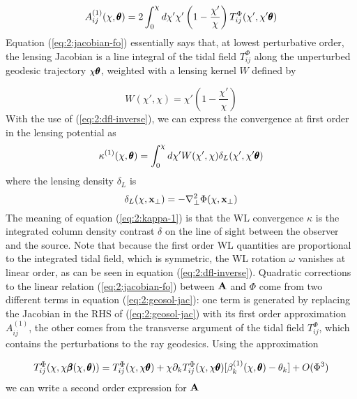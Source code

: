 \begin{equation}
\label{eq:2:jacobian-fo}
A_{ij}^{(1)}(\chi,\pmb{\theta}) = 2\int_0^\chi d\chi'\chi'\left(1-\frac{\chi'}{\chi}\right)T^{\Phi}_{ij}(\chi',\chi'\pmb{\theta})
\end{equation}
%
Equation (\ref{eq:2:jacobian-fo}) essentially says that, at lowest perturbative order, the lensing Jacobian is a line integral of the tidal field $T^{\Phi}_{ij}$ along the unperturbed geodesic trajectory $\chi\pmb{\theta}$, weighted with a lensing kernel $W$ defined by

\begin{equation}
W(\chi',\chi) = \chi'\left(1-\frac{\chi'}{\chi}\right) 
\end{equation}
%
With the use of (\ref{eq:2:dfl-inverse}), we can express the convergence at first order in the lensing potential as
\begin{equation}
\label{eq:2:kappa-1}
\kappa^{(1)}(\chi,\pmb{\theta}) = \int_0^{\chi}d\chi' W(\chi',\chi)\delta_L(\chi',\chi'\pmb{\theta})
\end{equation}
%
where the lensing density $\delta_L$ is 
\begin{equation}
\label{eq:2:deltalens}
\delta_L(\chi,\mathbf{x}_\perp) = -\nabla^2_\perp \Phi(\chi,\mathbf{x}_\perp)
\end{equation}
%
The meaning of equation (\ref{eq:2:kappa-1}) is that the WL convergence $\kappa$ is the integrated column density contrast $\delta$ on the line of sight between the observer and the source. Note that because the first order WL quantities are proportional to the integrated tidal field, which is symmetric, the WL rotation $\omega$ vanishes at linear order, as can be seen in equation (\ref{eq:2:dfl-inverse}). 
Quadratic corrections to the linear relation (\ref{eq:2:jacobian-fo}) between $\mathbf{A}$ and $\Phi$ come from two different terms in equation (\ref{eq:2:geosol-jac}): one term is generated by replacing the Jacobian in the RHS of (\ref{eq:2:geosol-jac}) with its first order approximation $A_{ij}^{(1)}$, the other comes from the transverse argument of the tidal field $T^{\Phi}_{ij}$, which contains the perturbations to the ray geodesics. Using the approximation

\begin{equation}
\label{eq:2:tidalapprox}
T^{\Phi}_{ij}(\chi,\chi\pmb{\beta}(\chi,\pmb{\theta})) = T^{\Phi}_{ij}(\chi,\chi\pmb{\theta}) + \chi\partial_kT^{\Phi}_{ij}(\chi,\chi\pmb{\theta})[\beta_k^{(1)}(\chi,\pmb{\theta})-\theta_k] + O(\Phi^3) 
\end{equation}
%
we can write a second order expression for $\mathbf{A}$ 

